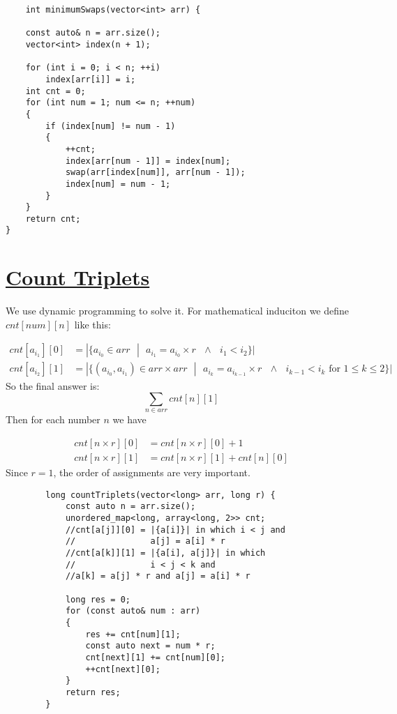 \documentclass{book}
\begin{document}
 	\begin{lstlisting}
    int minimumSwaps(vector<int> arr) {

    const auto& n = arr.size();
    vector<int> index(n + 1);

    for (int i = 0; i < n; ++i)
        index[arr[i]] = i;
    int cnt = 0;
    for (int num = 1; num <= n; ++num)
    {
        if (index[num] != num - 1)
        {
            ++cnt;
            index[arr[num - 1]] = index[num];
            swap(arr[index[num]], arr[num - 1]);
            index[num] = num - 1;
        }
    }
    return cnt;
}
 	\end{lstlisting}
 	\section{\href{https://www.hackerrank.com/challenges/count-triplets-1/problem}{Count Triplets}}	
 	We use dynamic programming to solve it. For mathematical induciton we define $cnt[num][n]$ like this:
 	
 	\begin{equation*}
 		\begin{split}
 		cnt[a_{i_1}][0] &= |\{a_{i_0} \in arr \text{ }| \text{ } a_{i_1} = a_{i_0} \times r \text{ }\land \text{ } i_1 < i_2\}| \\
 		cnt[a_{i_2}][1] &= |\{(a_{i_0}, a_{i_1}) \in arr \times arr \text{ }| \text{ } a_{i_k} = a_{i_{k - 1}} \times r \text{ }\land \text{ } i_{k - 1} < i_k  \text{ for }1 \le k \le 2\}|
 		\end{split}
 	\end{equation*}
 	So the final answer is:
 	\begin{equation*}
 	\sum_{n \in arr}{cnt[n][1]}
 	\end{equation*}
 	Then for each number $n$ we have
 	
 	\begin{equation*}
 	\begin{split}
 	cnt[n \times r][0] &= cnt[n \times r][0] + 1 \\
 	cnt[n \times r][1] &= cnt[n \times r][1] + cnt[n][0]
 	\end{split}
 	\end{equation*}
 	Since $r = 1$, the order of assignments are very important.
 	
 	\begin{lstlisting}
        long countTriplets(vector<long> arr, long r) {
            const auto n = arr.size();
            unordered_map<long, array<long, 2>> cnt;
            //cnt[a[j]][0] = |{a[i]}| in which i < j and 
            //               a[j] = a[i] * r
            //cnt[a[k]][1] = |{a[i], a[j]}| in which 
            //               i < j < k and 
            //a[k] = a[j] * r and a[j] = a[i] * r
            
            long res = 0;
            for (const auto& num : arr)
            {
                res += cnt[num][1];
                const auto next = num * r;
                cnt[next][1] += cnt[num][0];
                ++cnt[next][0];                       
            }
            return res;
        }
 	
 	\end{lstlisting}
\end{document}
